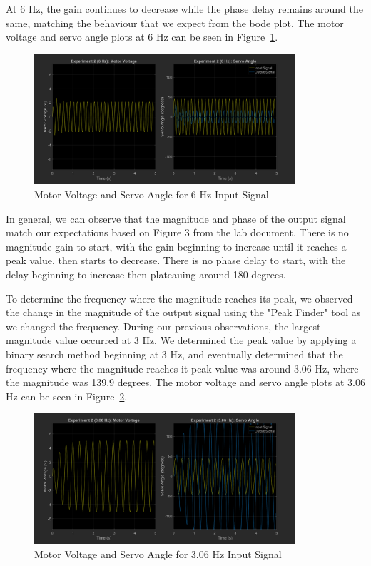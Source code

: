 \documentclass[12pt]{article}
\begin{document}
At 6 Hz, the gain continues to decrease while the phase delay remains around the same, matching the behaviour that we expect from the bode plot. The motor voltage and servo angle plots at 6 Hz can be seen in Figure~\ref{fig:exp2_6}.
\begin{figure}[h!]
    \centering
    \includegraphics[width=0.86\textwidth]{exp2_6}
    \caption{\label{fig:exp2_6}Motor Voltage and Servo Angle for 6 Hz Input Signal}
\end{figure}

In general, we can observe that the magnitude and phase of the output signal match our expectations based on Figure 3 from the lab document. There is no magnitude gain to start, with the gain beginning to increase until it reaches a peak value, then starts to decrease. There is no phase delay to start, with the delay beginning to increase then plateauing around 180 degrees.

To determine the frequency where the magnitude reaches its peak, we observed the change in the magnitude of the output signal using the "Peak Finder" tool as we changed the frequency. During our previous observations, the largest magnitude value occurred at 3 Hz. We determined the peak value by applying a binary search method beginning at 3 Hz, and eventually determined that the frequency where the magnitude reaches it peak value was around 3.06 Hz, where the magnitude was 139.9 degrees. The motor voltage and servo angle plots at 3.06 Hz can be seen in Figure~\ref{fig:exp2_3.06}.
\begin{figure}[h!]
    \centering
    \includegraphics[width=0.86\textwidth]{exp2_3.06}
    \caption{\label{fig:exp2_3.06}Motor Voltage and Servo Angle for 3.06 Hz Input Signal}
\end{figure}
\end{document}
